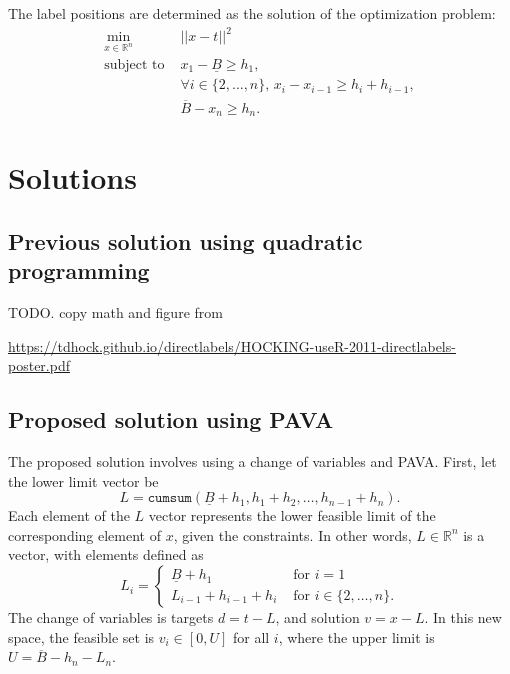 \documentclass{article}
\begin{document}
The label positions are determined as the solution of the optimization problem:
\begin{equation}
    \label{eq:label-pos}
\begin{aligned}
  \min_{x\in\mathbb R^n} & ||x-t||^2 \\
  \text{subject to }& x_1 - \underline B\geq h_1 ,\\
                    & \forall i\in\{2, \dots, n\},\, x_i-x_{i-1} \geq h_i + h_{i-1},\\
   & \overline B-x_n\geq h_n .
\end{aligned}
\end{equation}
\section{Solutions}

\subsection{Previous solution using quadratic programming}
TODO.
copy math and figure from

\url{https://tdhock.github.io/directlabels/HOCKING-useR-2011-directlabels-poster.pdf}


\subsection{Proposed solution using PAVA}

The proposed solution involves using a change of variables and PAVA.
First, let the lower limit vector be
\begin{equation}
  \label{eq:L}
  L = \texttt{cumsum}(\underline B+h_1, h_1+h_2, \dots, h_{n-1}+h_n).
\end{equation}
Each element of the $L$ vector represents the lower feasible limit of the corresponding element of $x$, given the constraints.
In other words, $L\in\mathbb R^n$ is a vector, with elements defined as
\begin{equation}
  \label{eq:L_i}
  L_i =
  \begin{cases}
    \underline B+h_1 & \text{ for } i=1\\
    L_{i-1}+h_{i-1}+h_i & \text{ for }i\in\{2,\dots, n\}.
  \end{cases}
\end{equation}
The change of variables is targets $d=t-L$, and solution $v=x-L$.
In this new space, the feasible set is $v_i\in [0, U]$ for all $i$, where the upper limit is $U=\overline B-h_n-L_n$.
\end{document}
